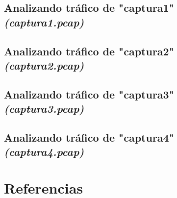\documentclass[11pt,a4paper]{article}
\begin{document}
\newpage
\subsection{Analizando tráfico de "captura1" \emph{(captura1.pcap)}}

\newpage
\subsection{Analizando tráfico de "captura2" \emph{(captura2.pcap)}}

\newpage
\subsection{Analizando tráfico de "captura3" \emph{(captura3.pcap)}}

\newpage
\subsection{Analizando tráfico de "captura4" \emph{(captura4.pcap)}}

\newpage
\section{Referencias}
\end{document}
